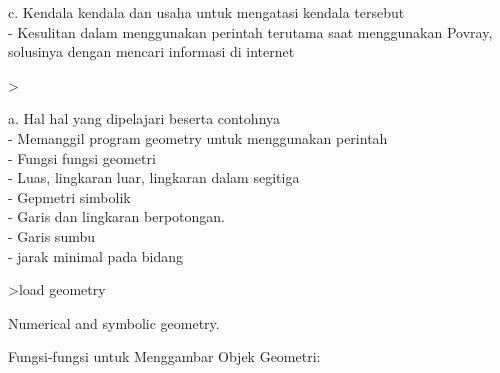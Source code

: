 \documentclass[a4paper,10pt]{article}
\begin{document}
\begin{eulernotebook}
\begin{eulercomment}
\begin{eulercomment}
\begin{eulercomment}
\begin{eulercomment}
\begin{eulercomment}
\begin{eulercomment}
\begin{eulercomment}
\begin{eulercomment}
\begin{eulercomment}
c. Kendala kendala dan usaha untuk mengatasi kendala tersebut\\
- Kesulitan dalam menggunakan perintah terutama saat menggunakan
Povray, solusinya dengan mencari informasi di internet\\
\end{eulercomment}
\eulersubheading{}
\begin{eulerprompt}
> 
\end{eulerprompt}
\begin{eulercomment}
\end{eulercomment}
\begin{eulercomment}
a. Hal hal yang dipelajari beserta contohnya\\
- Memanggil program geometry untuk menggunakan perintah\\
- Fungsi fungsi geometri\\
- Luas, lingkaran luar, lingkaran dalam segitiga\\
- Gepmetri simbolik\\
- Garis dan lingkaran berpotongan.\\
- Garis sumbu\\
- jarak minimal pada bidang
\end{eulercomment}
\begin{eulerprompt}
>load geometry
\end{eulerprompt}
\begin{euleroutput}
  Numerical and symbolic geometry.
\end{euleroutput}
\begin{eulercomment}
Fungsi-fungsi untuk Menggambar Objek Geometri:


\end{eulercomment}
\end{eulercomment}
\end{eulercomment}
\end{eulercomment}
\end{eulercomment}
\end{eulercomment}
\end{eulercomment}
\end{eulercomment}
\end{eulercomment}
\end{eulernotebook}
\end{document}
